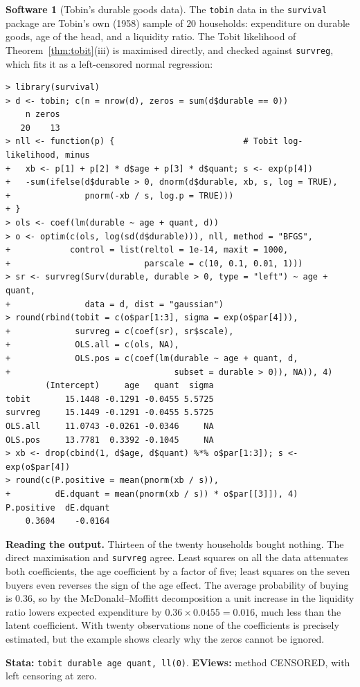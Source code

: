 \documentclass[11pt,a4paper]{article}
\numberwithin{equation}{section}
\theoremstyle{definition}
\newtheorem{software}[thm]{Software}
\begin{document}
\begin{software}[Tobin's durable goods data]
\label{sw:tobit}
The \texttt{tobin} data in the \texttt{survival} package are Tobin's own (1958) sample of $20$ households: expenditure on durable goods, age of the head, and a
liquidity ratio. The Tobit likelihood of Theorem~\ref{thm:tobit}(iii) is maximised directly, and checked against \texttt{survreg}, which fits it as a left-censored
normal regression:
{\small\begin{verbatim}
> library(survival)
> d <- tobin; c(n = nrow(d), zeros = sum(d$durable == 0))
    n zeros 
   20    13 
> nll <- function(p) {                          # Tobit log-likelihood, minus
+   xb <- p[1] + p[2] * d$age + p[3] * d$quant; s <- exp(p[4])
+   -sum(ifelse(d$durable > 0, dnorm(d$durable, xb, s, log = TRUE),
+               pnorm(-xb / s, log.p = TRUE)))
+ }
> ols <- coef(lm(durable ~ age + quant, d))
> o <- optim(c(ols, log(sd(d$durable))), nll, method = "BFGS",
+            control = list(reltol = 1e-14, maxit = 1000,
+                           parscale = c(10, 0.1, 0.01, 1)))
> sr <- survreg(Surv(durable, durable > 0, type = "left") ~ age + quant,
+               data = d, dist = "gaussian")
> round(rbind(tobit = c(o$par[1:3], sigma = exp(o$par[4])),
+             survreg = c(coef(sr), sr$scale),
+             OLS.all = c(ols, NA),
+             OLS.pos = c(coef(lm(durable ~ age + quant, d,
+                                 subset = durable > 0)), NA)), 4)
        (Intercept)     age   quant  sigma
tobit       15.1448 -0.1291 -0.0455 5.5725
survreg     15.1449 -0.1291 -0.0455 5.5725
OLS.all     11.0743 -0.0261 -0.0346     NA
OLS.pos     13.7781  0.3392 -0.1045     NA
> xb <- drop(cbind(1, d$age, d$quant) %*% o$par[1:3]); s <- exp(o$par[4])
> round(c(P.positive = mean(pnorm(xb / s)),
+         dE.dquant = mean(pnorm(xb / s)) * o$par[[3]]), 4)
P.positive  dE.dquant 
    0.3604    -0.0164 
\end{verbatim}}
\textbf{Reading the output.} Thirteen of the twenty households bought nothing. The direct maximisation and \texttt{survreg} agree. Least squares on all the data
attenuates both coefficients, the age coefficient by a factor of five; least squares on the seven buyers even reverses the sign of the age effect. The
average probability of buying is $0.36$, so by the McDonald--Moffitt decomposition a unit increase in the liquidity ratio lowers expected expenditure
by $0.36 \times 0.0455 = 0.016$, much less than the latent coefficient. With twenty observations none of the coefficients is precisely estimated, but the
example shows clearly why the zeros cannot be ignored.

\textbf{Stata:} \texttt{tobit durable age quant, ll(0)}. \textbf{EViews:} method CENSORED, with left censoring at zero.
\end{software}
\end{document}
